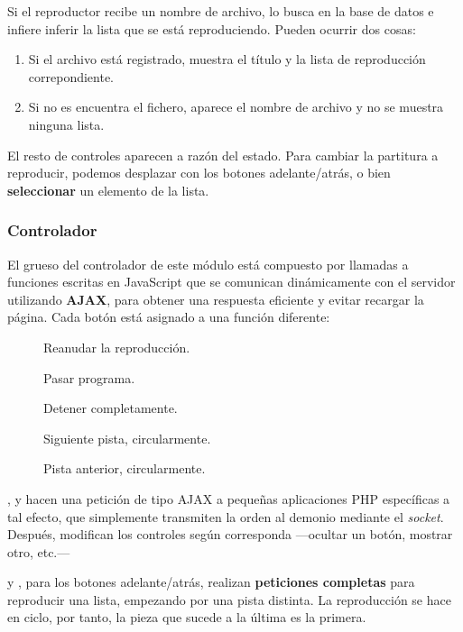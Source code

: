 \smallskip

Si el reproductor recibe un nombre de archivo, lo busca en la base de datos e infiere inferir la lista que se está reproduciendo. Pueden ocurrir dos cosas:

\begin{enumerate}
	\item Si el archivo está registrado, muestra el título y la lista de reproducción correpondiente.
	\item Si no es encuentra el fichero, aparece el nombre de archivo y no se muestra ninguna lista.
\end{enumerate}

El resto de controles aparecen a razón del estado. Para cambiar la partitura a reproducir, podemos desplazar con los botones adelante/atrás, o bien \textbf{seleccionar} un elemento de la lista.

\subsubsection{Controlador}

El grueso del controlador de este módulo está compuesto por llamadas a funciones escritas en JavaScript que se comunican dinámicamente con el servidor utilizando \textbf{\acrshort{AJAX}}, para obtener una respuesta eficiente y evitar recargar la página. Cada botón está asignado a una función diferente:

\begin{description}
	\item[] Reanudar la reproducción.
	\item[] Pasar programa.
	\item[] Detener completamente.
	\item[] Siguiente pista, circularmente.
	\item[] Pista anterior, circularmente.
\end{description}

,  y  hacen una petición de tipo \acrshort{AJAX} a pequeñas aplicaciones \acrshort{PHP} específicas a tal efecto, que simplemente transmiten la orden al demonio mediante el \textit{socket}. Después, modifican los controles según corresponda ---ocultar un botón, mostrar otro, etc.---

 y , para los botones adelante/atrás, realizan \textbf{peticiones completas} para reproducir una lista, empezando por una pista distinta. La reproducción se hace en ciclo, por tanto, la pieza que sucede a la última es la primera.

